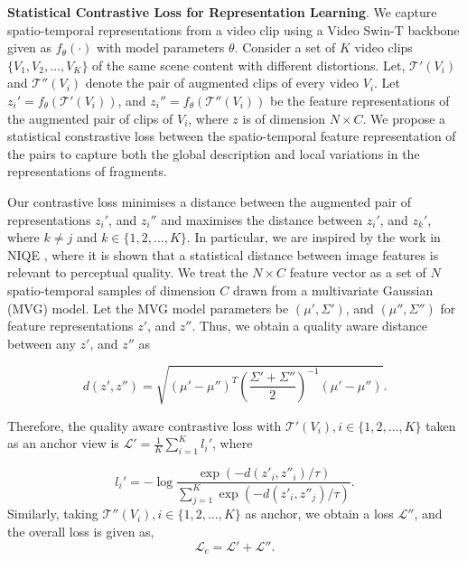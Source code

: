 \documentclass[10pt,twocolumn,letterpaper]{article}
\begin{document}
\textbf{Statistical Contrastive Loss for Representation Learning}. We capture spatio-temporal representations from a video clip using a Video Swin-T \cite{video_swin_t} backbone given as $f_{\theta}(\cdot)$ with model parameters $\theta$.  Consider a set of $K$ video clips $\{ V_1, V_2, \ldots, V_K\}$ of the same scene content with different distortions. Let, $\mathcal{T}'(V_i)$ and $\mathcal{T}''(V_i)$ denote the pair of augmented clips of every video $V_i$. Let $z_i' = f_{\theta}(\mathcal{T}'(V_i))$, and $z_i'' = f_{\theta}(\mathcal{T}''(V_i))$ be the feature representations of the augmented pair of clips of $V_i$, where $z$ is of dimension $N\times C$.
We propose a statistical constrastive loss between the spatio-temporal feature representation of the pairs to capture both the global description and local variations in the representations of fragments. 

Our contrastive loss minimises a distance between the augmented pair of representations $z_i'$, and $z_i''$ and maximises the distance between $z_i'$, and $z_k'$, where $k\neq j$ and $k\in\{1,2,\ldots,K\}$.  In particular, we are inspired by the work in NIQE \cite{niqe}, where it is shown that a statistical distance between image features is relevant to perceptual quality.  We treat the $N\times C$ feature vector as a set of $N$ spatio-temporal samples of dimension $C$ drawn from a multivariate Gaussian (MVG) model. Let the MVG model parameters be $(\mu', \Sigma')$, and $(\mu'', \Sigma'')$ for feature representations $z'$, and $z''$. Thus, we obtain a quality aware distance between any $z'$, and $z''$ as

\begin{equation}
    d(z',z'') = \sqrt{(\mu' -\mu'')^T \left(\frac{\Sigma' +\Sigma''}{2} \right)^{-1} (\mu' - \mu'')}. 
    \label{niqe_distance}
\end{equation}

Therefore, the quality aware contrastive loss with $\mathcal{T}'(V_i), i\in\{1,2,\ldots,K\}$ taken as an anchor view is $ \mathcal{L}' = \frac{1}{K} \sum_{i=1}^K l_i' $, where 

\begin{equation}
     l_i' = - \log \frac{\exp(- d(z'_i,z''_i)/ \tau)}{\sum_{j=1}^K\exp(- d(z'_i,z''_j)/ \tau)}.
     \label{contrastive_loss}
\end{equation}
Similarly, taking $\mathcal{T}''(V_i), i\in\{1,2,\ldots,K\}$ as anchor, we obtain a loss $\mathcal{L}''$, and the overall loss is given as,
\begin{equation}
    \mathcal{L}_c = \mathcal{L}' + \mathcal{L}''.
    \label{contrastive_objective}
\end{equation}
\end{document}

